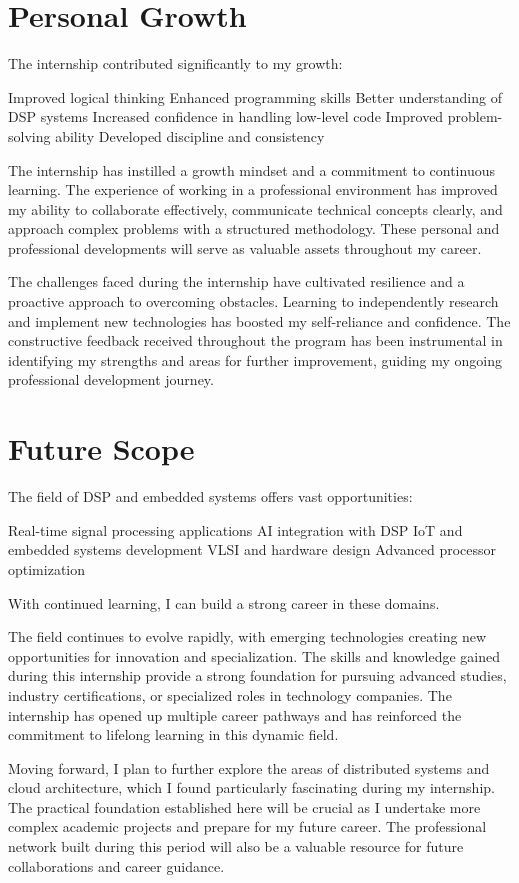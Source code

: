 \documentclass[12pt,a4paper]{report}
\begin{document}
\section{Personal Growth}

The internship contributed significantly to my growth:


Improved logical thinking Enhanced programming skills Better understanding of DSP systems Increased confidence in handling low-level code Improved problem-solving ability Developed discipline and consistency


The internship has instilled a growth mindset and a commitment to continuous learning. The experience of working in a professional environment has improved my ability to collaborate effectively, communicate technical concepts clearly, and approach complex problems with a structured methodology. These personal and professional developments will serve as valuable assets throughout my career.


The challenges faced during the internship have cultivated resilience and a proactive approach to overcoming obstacles. Learning to independently research and implement new technologies has boosted my self-reliance and confidence. The constructive feedback received throughout the program has been instrumental in identifying my strengths and areas for further improvement, guiding my ongoing professional development journey.


\section{Future Scope}

The field of DSP and embedded systems offers vast opportunities:


Real-time signal processing applications AI integration with DSP IoT and embedded systems development VLSI and hardware design Advanced processor optimization


With continued learning, I can build a strong career in these domains.


The field continues to evolve rapidly, with emerging technologies creating new opportunities for innovation and specialization. The skills and knowledge gained during this internship provide a strong foundation for pursuing advanced studies, industry certifications, or specialized roles in technology companies. The internship has opened up multiple career pathways and has reinforced the commitment to lifelong learning in this dynamic field.


Moving forward, I plan to further explore the areas of distributed systems and cloud architecture, which I found particularly fascinating during my internship. The practical foundation established here will be crucial as I undertake more complex academic projects and prepare for my future career. The professional network built during this period will also be a valuable resource for future collaborations and career guidance.
\end{document}
